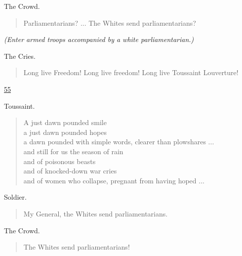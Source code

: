 \documentclass[letterpaper,article,12pt,oneside,notitlepage]{memoir}
\begin{document}
\begin{center}The Crowd.\end{center}

\begin{verse}
Parliamentarians? ... The Whites send parliamentarians? \\
\end{verse}

\textit{(Enter armed troops accompanied by a white parliamentarian.)}

\begin{center}The Cries.\end{center}

\begin{verse}
Long live Freedom! Long live freedom! Long live Toussaint Louverture! \\
\end{verse}

\clearpage

\href{http://cesaire.elotroalex.com/chiens/chiens/p055.html}{55}

\begin{center}Toussaint.\end{center}

\begin{verse}
A just dawn pounded smile \\
a just dawn pounded hopes \\
a dawn pounded with simple words, clearer than plowshares ... \\
and still for us the season of rain \\
and of poisonous beasts \\
and of knocked-down war cries \\
and of women who collapse, pregnant from having hoped ... \\
\end{verse}

\begin{center}Soldier.\end{center}

\begin{verse}
\hspace{1cm} My General, the Whites send parliamentarians. \\
\end{verse}

\begin{center}The Crowd.\end{center}

\begin{verse}
The Whites send parliamentarians! \\
\end{verse}
\end{document}
